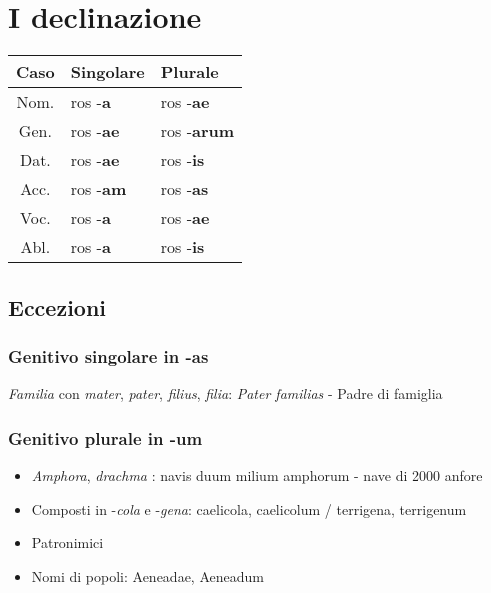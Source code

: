 \section{I declinazione}

\begin{table}[h!]
\centering
    \begin{tabular}{|c|l|l|}
        \hline
        \textbf{Caso} & \textbf{Singolare} & \textbf{Plurale} \\
        \hline
        Nom. & ros -\textbf{a}  & ros -\textbf{ae} \\
        \hline
        Gen. & ros -\textbf{ae} & ros -\textbf{arum} \\
        \hline
        Dat. & ros -\textbf{ae} & ros -\textbf{is} \\
        \hline
        Acc. & ros -\textbf{am} & ros -\textbf{as} \\
        \hline
        Voc. & ros -\textbf{a}  & ros -\textbf{ae} \\
        \hline
        Abl. & ros -\textbf{a}  & ros -\textbf{is} \\
        \hline
    \end{tabular}
\end{table}

\subsection{Eccezioni}
\subsubsection*{Genitivo singolare in -as}
\textit{Familia} con \textit{mater}, \textit{pater}, \textit{filius}, \textit{filia}: \textit{Pater familias} - Padre di famiglia

\subsubsection*{Genitivo plurale in -um}
\begin{itemize}
    \item \textit{Amphora}, \textit{drachma} : navis duum milium amphorum - nave di 2000 anfore
    \item Composti in -\textit{cola} e -\textit{gena}: caelicola, caelicolum / terrigena, terrigenum
    \item Patronimici
    \item Nomi di popoli: Aeneadae, Aeneadum
\end{itemize}

